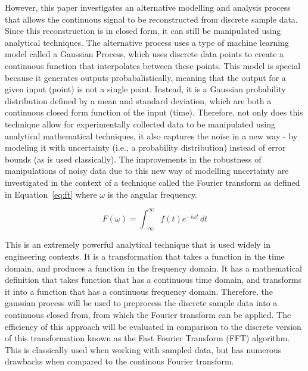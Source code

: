 \documentclass[12pt]{article}
\begin{document}
    However, this paper investigates an alternative modelling and analysis process that allows the continuous signal to be reconstructed from discrete sample data.
    Since this reconstruction is in closed form, it can still be manipulated using analytical techniques.
    The alternative process uses a type of machine learning model called a Gaussian Process, which uses discrete data points to create a continuous function that interpolates between these points.
    This model is special because it generates outputs probabalistically, meaning that the output for a given input (point) is not a single point.
    Instead, it is a Gaussian probability distribution defined by a mean and standard deviation, which are both a continuous closed form function of the input (time).
    Therefore, not only does this technique allow for experimentally collected data to be manipulated using analytical mathematical techniques, it also captures the noise in a new way - by modeling it with uncertainty (i.e., a probability distribution) instead of error bounds (as is used classically).
    The improvements in the robustness of manipulations of noisy data due to this new way of modelling uncertainty are investigated in the context of a technique called the Fourier transform as defined in Equation~\ref{eq:ft} where \( \omega \) is the angular frequency.

    \begin{equation}
        F(\omega) = \int_{-\infty}^{\infty} f(t) e^{-i \omega t} \, dt\label{eq:ft}
    \end{equation}


    This is an extremely powerful analytical technique that is used widely in engineering contexts.
    It is a transformation that takes a function in the time domain, and produces a function in the frequency domain.
    It has a mathematical definition that takes function that has a continuous time domain, and transforms it into a function that has a continuous frequency domain.
    Therefore, the gaussian process will be used to preprocess the discrete sample data into a continuous closed from, from which the Fourier transform can be applied.
    The efficiency of this approach will be evaluated in comparison to the discrete version of this transformation known as the Fast Fourier Transform (FFT) algorithm.
    This is classically used when working with sampled data, but has numerous drawbacks when compared to the continous Fourier transform.
\end{document}
